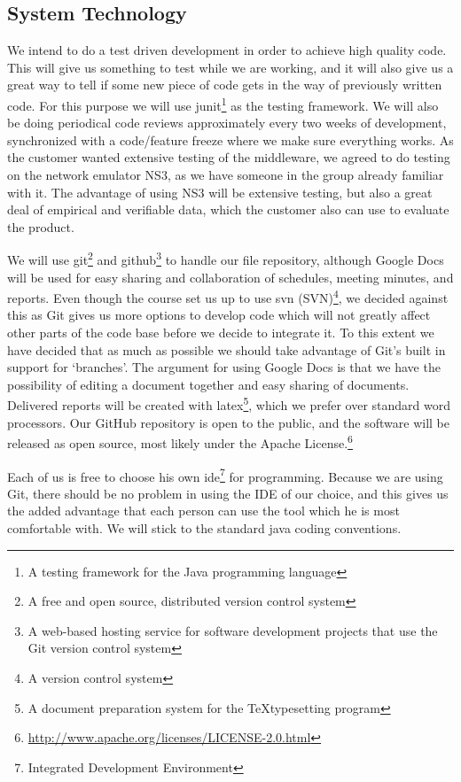     \subsection{System Technology}\label{System Technology}
    
    We  intend to do a test driven development in order to achieve high quality code. This will give us something to test while we are working, and it will also give us a great way to tell if some new piece of code gets in the way of previously written code. For this purpose we will use \gls{junit}\footnote{A testing framework for the Java programming language} as the testing framework. We will also be doing periodical code reviews approximately every two weeks of development, synchronized with a code/feature freeze where we make sure everything works. As the customer wanted extensive testing of the middleware, we agreed to do testing on the network emulator NS3, as we have someone in the group already familiar with it. The advantage of using NS3 will be extensive testing, but also a great deal of empirical and verifiable data, which the customer also can use to evaluate the product.

    We will use \gls{git}\footnote{A free and open source, distributed version control system} and \gls{github}\footnote{A web-based hosting service for software development projects that use the Git version control system} to handle our file repository, although Google Docs will be used for easy sharing and collaboration of schedules, meeting minutes, and reports. Even though the course set us up to use \gls{svn} (SVN)\footnote{A version control system}, we decided against this as Git gives us more options to develop code which will not greatly affect other parts of the code base before we decide to integrate it. To this extent we have decided that as much as possible we should take advantage of Git’s built in support for ‘branches’. The argument for using Google Docs is that we have the possibility of editing a document together and easy sharing of documents. Delivered reports will be created with \gls{latex}\footnote{A document preparation system for the \TeX typesetting program}, which we prefer over standard word processors. Our GitHub repository is open to the public, and the software will be released as open source, most likely under the Apache License.\footnote{\url{http://www.apache.org/licenses/LICENSE-2.0.html}}

    Each of us is free to choose his own \gls{ide}\footnote{Integrated Development Environment} for programming. Because we are using Git, there should be no problem in using the IDE of our choice, and this gives us the added advantage that each person can use the tool which he is most comfortable with. We will stick to the standard \gls{java coding conventions}.
    

